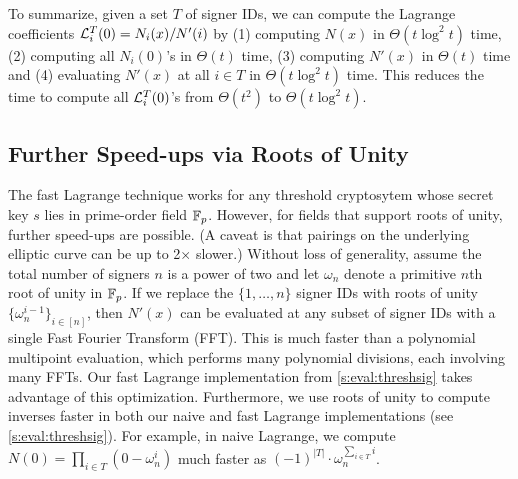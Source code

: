 To summarize, given a set $T$ of signer IDs, we can compute the Lagrange coefficients $\mathcal{L}_i^T(0) = N_i(x) / N'(i)$ by (1) computing $N(x)$ in $\Theta(t\log^2{t})$ time, (2) computing all $N_i(0)$'s in $\Theta(t)$ time, (3) computing $N'(x)$ in $\Theta(t)$ time and (4) evaluating $N'(x)$ at all $i\in T$ in $\Theta(t\log^2{t})$ time.
This reduces the time to compute all $\mathcal{L}_i^T(0)$'s from $\Theta(t^2)$ to $\Theta(t\log^2{t})$.

\subsection{Further Speed-ups via Roots of Unity}
\label{s:threshsig:roots-of-unity}
The fast Lagrange technique works for any threshold cryptosytem whose secret key $s$ lies in prime-order field $\mathbb{F}_p$.
However, for fields that support roots of unity, further speed-ups are possible.
(A caveat is that pairings on the underlying elliptic curve can be up to 2$\times$ slower.)
Without loss of generality, assume the total number of signers $n$ is a power of two and let $\omega_n$ denote a primitive $n$th root of unity in $\mathbb{F}_p$.
If we replace the $\{1,\dots,n\}$ signer IDs with roots of unity $\{\omega_n^{i-1}\}_{i\in[n]}$, then $N'(x)$ can be evaluated at any subset of signer IDs with a single Fast Fourier Transform (FFT).
This is much faster than a polynomial multipoint evaluation, which performs many polynomial divisions, each involving many FFTs.
Our fast Lagrange implementation from \cref{s:eval:threshsig} takes advantage of this optimization.
Furthermore, we use roots of unity to compute inverses faster in both our naive and fast Lagrange implementations (see \cref{s:eval:threshsig}).
For example, in naive Lagrange, we compute $N(0)=\prod_{i\in T}(0-\omega_n^i)$ much faster as $(-1)^{|T|}\cdot \omega_n^{\sum_{i\in T} i}$.
